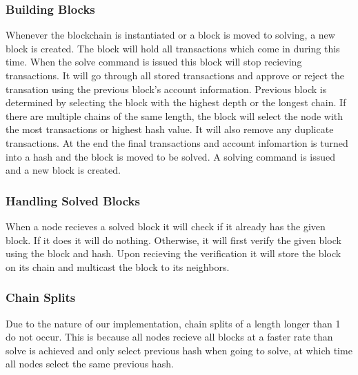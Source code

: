 \documentclass{article}
\begin{document}
        \subsubsection{Building Blocks}
                Whenever the blockchain is instantiated or a block is moved to solving, a new block is created. The block will hold all transactions which come in during this time. When the solve command is issued this block will stop recieving transactions. It will go through all stored transactions and approve or reject the transation using the previous block's account information. Previous block is determined by selecting the block with the highest depth or the
                longest chain. If there are multiple chains of the same length, the block will select the node with the most transactions or highest hash value. It will also remove any duplicate transactions. At the end the final transactions and
                account infomartion is turned into a hash and the block is moved to be solved. A solving command is issued and a new block is created.
        \subsubsection{Handling Solved Blocks}
                When a node recieves a solved block it will check if it already has the given block. If it does it will do nothing. Otherwise, it will first verify the given block using the block and hash. Upon recieving the verification it will store the block on its chain and multicast the block to its neighbors.
        \subsubsection{Chain Splits}
                Due to the nature of our implementation, chain splits of a length longer than 1 do not occur. This is because all nodes recieve all blocks at a faster rate than solve is achieved and only select previous hash when going to solve, at which time all nodes select the same previous hash.
\end{document}
